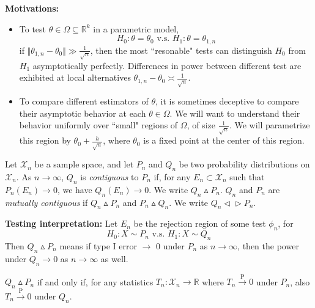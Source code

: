 \documentclass[a4paper]{article}
\begin{document}
\newpage
\noindent \textbf{Motivations:}
\begin{itemize}
	\item To test $\theta \in \Omega \subseteq \mathbb{R}^k$ in a parametric model, 
	\begin{equation*}
		H_0: \theta = \theta_0 \text{ v.s. } H_1: \theta = \theta_{1,n}
	\end{equation*}
	if $\Vert \theta_{1,n} - \theta_0 \Vert \gg \frac{1}{\sqrt{n}}$, then the most ``resonable" tests can distinguish $H_0$ from $H_1$ asymptotically perfectly. Differences in power between different test are exhibited at local alternatives $\theta_{1,n} - \theta_0 \asymp \frac{1}{\sqrt{n}}$.
	\item To compare different estimators of $\theta$, it is sometimes deceptive to compare their asymptotic behavior at each $\theta \in \Omega$. We will want to understand their behavior uniformly over ``small" regions of $\Omega$, of size $\frac{1}{\sqrt{n}}$. We will parametrize this region by $\theta_0 + \frac{h}{\sqrt{n}}$, where $\theta_0$ is a fixed point at the center of this region.
\end{itemize}

\begin{defi}
	Let $\mathcal{X}_n$ be a sample space, and let $P_n$ and $Q_n$ be two probability distributions on $\mathcal{X}_n$. As $n \to \infty$, $Q_n$ is \emph{contiguous} to $P_n$ if, for any $E_n \subset \mathcal{X}_n$ such that $P_n(E_n) \to 0$, we have $Q_n(E_n) \to 0$. We write $Q_n \vartriangle P_n$. $Q_n$ and $P_n$ are \emph{mutually contiguous} if $Q_n \vartriangle P_n$ and $P_n \vartriangle Q_n$. We write $Q_n \vartriangleleft \vartriangleright P_n$.
\end{defi}

\noindent \textbf{Testing interpretation:} Let $E_n$ be the rejection region of some test $\phi_n$, for
\begin{equation*}
	H_0: X \sim P_n \text{ v.s. } H_1: X \sim Q_n
\end{equation*}
	Then $Q_n \vartriangle P_n$ means if type I error $\to$ 0 under $P_n$ as $n \to \infty$, then the power under $Q_n \to 0$ as $n \to \infty$ as well.
	
\begin{prop}
	$Q_n \vartriangle P_n$ if and only if, for any statistics $T_n: \mathcal{X}_n \to \mathbb{R}$ where $T_n \stackrel{\text{P}}{\longrightarrow} 0$ under $P_n$, also $T_n \stackrel{\text{P}}{\longrightarrow} 0$ under $Q_n$.
\end{prop}	
\end{document}

